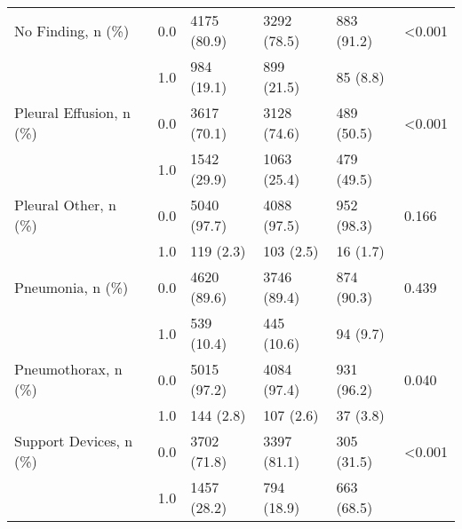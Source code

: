 \begin{tabular}{llllll}
No Finding, n (\%) & 0.0 &             4175 (80.9) &  3292 (78.5) &  883 (91.2) &  <0.001 \\
                       & 1.0 &              984 (19.1) &   899 (21.5) &    85 (8.8) &         \\
Pleural Effusion, n (\%) & 0.0 &             3617 (70.1) &  3128 (74.6) &  489 (50.5) &  <0.001 \\
                       & 1.0 &             1542 (29.9) &  1063 (25.4) &  479 (49.5) &         \\
Pleural Other, n (\%) & 0.0 &             5040 (97.7) &  4088 (97.5) &  952 (98.3) &   0.166 \\
                       & 1.0 &               119 (2.3) &    103 (2.5) &    16 (1.7) &         \\
Pneumonia, n (\%) & 0.0 &             4620 (89.6) &  3746 (89.4) &  874 (90.3) &   0.439 \\
                       & 1.0 &              539 (10.4) &   445 (10.6) &    94 (9.7) &         \\
Pneumothorax, n (\%) & 0.0 &             5015 (97.2) &  4084 (97.4) &  931 (96.2) &   0.040 \\
                       & 1.0 &               144 (2.8) &    107 (2.6) &    37 (3.8) &         \\
Support Devices, n (\%) & 0.0 &             3702 (71.8) &  3397 (81.1) &  305 (31.5) &  <0.001 \\
                       & 1.0 &             1457 (28.2) &   794 (18.9) &  663 (68.5) &         \\
\bottomrule
\end{tabular}
